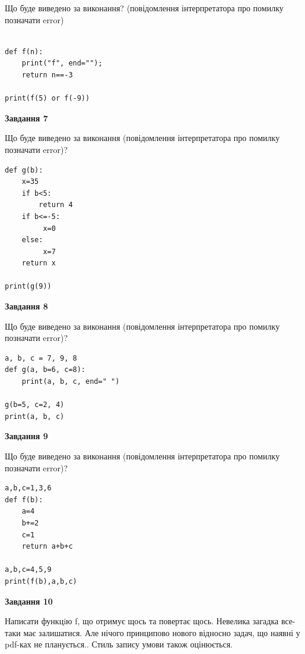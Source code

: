 \documentclass[12pt, ukrainian]{article}
\begin{document}
{\begin {large}
Що буде виведено за виконання? (повідомлення інтерпретатора про помилку позначати error)\par
\begin{verbatim}

def f(n):
    print("f", end="");
    return n==-3

print(f(5) or f(-9))
\end{verbatim}

{\begin {center}\textbf{Завдання 7}\end {center}}

Що буде виведено за виконання (повідомлення інтерпретатора про помилку позначати error)?\par
\begin{verbatim}
def g(b):
    x=35
    if b<5: 
        return 4
    if b<=-5:
         x=0
    else:
         x=7
    return x

print(g(9))
\end{verbatim}

{\begin {center}\textbf{Завдання 8}\end {center}}

Що буде виведено за виконання (повідомлення інтерпретатора про помилку позначати error)?\par
\begin{verbatim}
a, b, c = 7, 9, 8
def g(a, b=6, c=8):
    print(a, b, c, end=" ")

g(b=5, c=2, 4)
print(a, b, c)
\end{verbatim}

{\begin {center}\textbf{Завдання 9}\end {center}}

Що буде виведено за виконання (повідомлення інтерпретатора про помилку позначати error)?\par
\begin{verbatim}
a,b,c=1,3,6
def f(b):
    a=4
    b+=2
    c=1
    return a+b+c

a,b,c=4,5,9
print(f(b),a,b,c)
\end{verbatim}

{\begin {center}\textbf{Завдання 10}\end {center}}


Написати функцiю f, що отримує щось та повертає щось. Невелика загадка все-таки має залишатися. Але нічого принципово нового відносно задач, що наявні у pdf-ках не планується.. Стиль запису умови також оцінюється.\par
\end {large}}
\newpage
\end{document}
